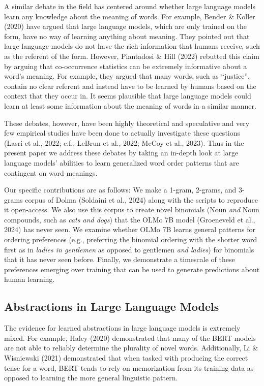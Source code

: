 \documentclass[
  10pt,
  nohyperref]{acl}
\begin{document}
A similar debate in the field has centered around whether large language
models learn any knowledge about the meaning of words. For example,
Bender \& Koller (2020) have argued that large language models, which
are only trained on the form, have no way of learning anything about
meaning. They pointed out that large language models do not have the
rich information that humans receive, such as the referent of the form.
However, Piantadosi \& Hill (2022) rebutted this claim by arguing that
co-occurrence statistics can be extremely informative about a word's
meaning. For example, they argued that many words, such as ``justice'',
contain no clear referent and instead have to be learned by humans based
on the context that they occur in. It seems plausible that large
language models could learn at least some information about the meaning
of words in a similar manner.

These debates, however, have been highly theoretical and speculative and
very few empirical studies have been done to actually investigate these
questions (Lasri et al., 2022; c.f., LeBrun et al., 2022; McCoy et al.,
2023). Thus in the present paper we address these debates by taking an
in-depth look at large language models' abilities to learn generalized
word order patterns that are contingent on word meanings.

Our specific contributions are as follows: We make a 1-gram, 2-grams,
and 3-grams corpus of Dolma (Soldaini et al., 2024) along with the
scripts to reproduce it open-access. We also use this corpus to create
novel binomials (Noun \emph{and} Noun compounds, such as \emph{cats and
dogs}) that the OLMo 7B model (Groeneveld et al., 2024) has never seen.
We examine whether OLMo 7B learns general patterns for ordering
preferences (e.g., preferring the binomial ordering with the shorter
word first as in \emph{ladies in gentlemen} as opposed to gentlemen
\emph{and ladies}) for binomials that it has never seen before. Finally,
we demonstrate a timescale of these preferences emerging over training
that can be used to generate predictions about human learning.

\subsection{Abstractions in Large Language
Models}\label{abstractions-in-large-language-models}

The evidence for learned abstractions in large language models is
extremely mixed. For example, Haley (2020) demonstrated that many of the
BERT models are not able to reliably determine the plurality of novel
words. Additionally, Li \& Wisniewski (2021) demonstrated that when
tasked with producing the correct tense for a word, BERT tends to rely
on memorization from its training data as opposed to learning the more
general linguistic pattern.
\end{document}
